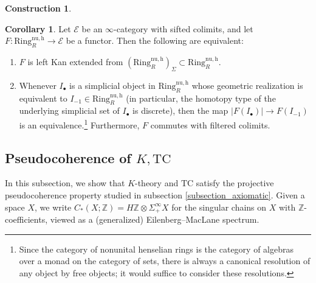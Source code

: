 \documentclass{amsart}
\theoremstyle{definition}
\newtheorem{corollary}[definition]{Corollary}
\newtheorem{cons}[definition]{Construction}
\newcommand{\TC}{\mathrm{TC}}
\newcommand{\nuh}{\mathrm{Ring}^{\mathrm{nu,h}}_R}
\begin{document}
\begin{cons}
\begin{corollary} 
\label{kanextcrit}
Let $\mathcal{E}$ be an $\infty$-category with sifted colimits, and let $F: \nuh \to \mathcal{E}$ be a functor. Then the following are equivalent: 
\begin{enumerate}
\item $F$ is left Kan extended from $(\nuh)_{\Sigma} \subset \nuh$. 
\item Whenever $I_\bullet$ is a simplicial object in $\nuh$ whose geometric
realization is equivalent to $I_{-1} \in \nuh$ (in particular, the homotopy type
of the underlying simplicial set of $I_\bullet$ is discrete), then the map 
$|F(I_\bullet)| \to F(I_{-1})$ is an equivalence.\footnote{Since the category
of nonunital henselian rings is the category of algebras over a monad on the
category of sets, there is always a canonical resolution of any object by free
objects; it would suffice to consider these resolutions.} 
Furthermore, $F$ commutes with filtered colimits. 
\end{enumerate}
\end{corollary} 
\end{cons}



\subsection{Pseudocoherence of $K, \TC$}
In this subsection, we show that $K$-theory and $\TC$ satisfy the
projective pseudocoherence property studied in subsection \ref{subsection_axiomatic}.
Given a space $X$, we write $C_*(X; \mathbb{Z}) = H\mathbb{Z}\otimes \Sigma^\infty_+ X$ for the singular chains on $X$
with $\mathbb{Z}$-coefficients, viewed as a (generalized) Eilenberg--MacLane spectrum.
\end{document}
